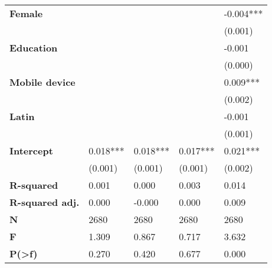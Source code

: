 \begin{tabular}{lllll}
\textbf{Female                           } &            &            &            &  -0.004*** \\
                                  &            &            &            &    (0.001) \\
\textbf{Education                        } &            &            &            &     -0.001 \\
                                  &            &            &            &    (0.000) \\
\textbf{Mobile device                    } &            &            &            &   0.009*** \\
                                  &            &            &            &    (0.002) \\
\textbf{Latin                            } &            &            &            &     -0.001 \\
                                  &            &            &            &    (0.001) \\
\textbf{Intercept                        } &   0.018*** &   0.018*** &   0.017*** &   0.021*** \\
                                  &    (0.001) &    (0.001) &    (0.001) &    (0.002) \\
\textbf{R-squared                        } &      0.001 &      0.000 &      0.003 &      0.014 \\
\textbf{R-squared adj.                   } &      0.000 &     -0.000 &      0.000 &      0.009 \\
\textbf{N                                } &       2680 &       2680 &       2680 &       2680 \\
\textbf{F                                } &      1.309 &      0.867 &      0.717 &      3.632 \\
\textbf{P(>f)                            } &      0.270 &      0.420 &      0.677 &      0.000 \\
\bottomrule
\end{tabular}
